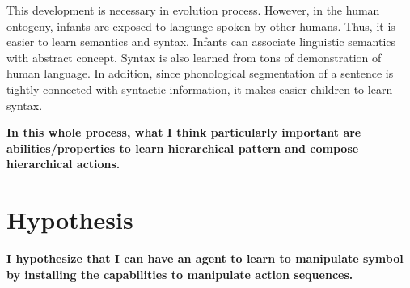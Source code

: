 \documentclass[12pt]{article}
\begin{document}
This development is necessary in evolution process. However, in the human ontogeny, infants are 
exposed to language spoken by other humans. Thus, it is easier to learn semantics and syntax. 
Infants can associate linguistic semantics with abstract concept. Syntax is also learned from 
tons of demonstration of human language. In addition, since phonological segmentation of a sentence 
is tightly connected with syntactic information, it makes easier children to learn syntax.

\textbf{In this whole process, what I think particularly important are abilities/properties to learn hierarchical pattern 
and compose hierarchical actions.}

\section{Hypothesis}
\textbf{I hypothesize that I can have an agent to learn to manipulate symbol by installing the capabilities to 
manipulate action sequences. }



\end{document}

